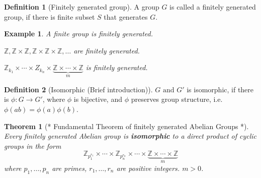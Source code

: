 \documentclass{article}
\theoremstyle{MyNonumberplain}
\theoremstyle{break}
\newcommand{\infixand}{\text{ and }}
\theoremstyle{break}
\newtheorem{theorem}{Theorem}[section]
\newtheorem{example}{Example}[section]
\theoremstyle{break}
\theoremstyle{definition}
\theoremstyle{break}
\newtheorem{definition}{Definition}[section]
\begin{document}
\begin{defbox}
    \begin{definition}[Finitely generated group]
        A group $G$ is called a finitely generated group, if there is finite subset $S$ that generates $G$.
    \end{definition}
\end{defbox}

\begin{expbox}
    \begin{example}
        A finite group is finitely generated.\bigskip

        $\mathbb{Z}, \mathbb{Z} \times \mathbb{Z}, \mathbb{Z} \times \mathbb{Z} \times
        \mathbb{Z}, \ldots$ are finitely generated.\bigskip

        $\mathbb{Z}_{k_1} \times \cdots \times Z_{k_n} \times
        \underset{m}{\underbrace{\mathbb{Z} \times \cdots \times \mathbb{Z}}}$ is
        finitely generated. 
    \end{example}
\end{expbox}

\begin{defbox}
    \begin{definition}[Isomorphic (Brief introduction)]
        $G \infixand G'$ is isomorphic, if there is $\phi : G \rightarrow G'$, where
        $\phi$ is bijective, and $\phi$ preserves group structure, i.e. $\phi (a b) =
        \phi (a) \phi (b)$.
    \end{definition}
\end{defbox}

\begin{thmbox}
    \begin{theorem}[* Fundamental Theorem of finitely generated Abelian Groups *]
        Every finitely generated Abelian group is {\textbf{isomorphic}} to a direct
        product of cyclic groups in the form
        \[ \mathbb{Z}_{p_1^{r_1}} \times \cdots \times \mathbb{Z}_{p_n^{r_n}} \times
        \cdots \times {\underbrace{\mathbb{Z} \times \cdots \times
        \mathbb{Z}}_{m}} \]
        where $p_1, \ldots, p_n$ are primes, $r_1, \ldots, r_n$ are positive integers.
        $m > 0$. 
    \end{theorem}
\end{thmbox}
\end{document}
